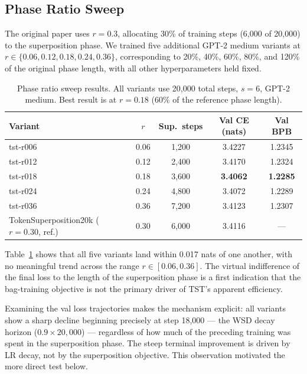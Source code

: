 \documentclass{article}
\begin{document}
\subsection{Phase Ratio Sweep}

The original paper uses $r=0.3$, allocating 30\% of training steps (6{,}000 of 20{,}000)
to the superposition phase.
We trained five additional GPT-2 medium variants at $r \in \{0.06, 0.12, 0.18, 0.24, 0.36\}$,
corresponding to 20\%, 40\%, 60\%, 80\%, and 120\% of the original phase length,
with all other hyperparameters held fixed.

\begin{table}[h]
\centering
\begin{tabular}{lcccc}
\toprule
\textbf{Variant} & \textbf{$r$} & \textbf{Sup.\ steps} & \textbf{Val CE (nats)} & \textbf{Val BPB} \\
\midrule
tst-r006 & 0.06 & 1{,}200 & 3.4227 & 1.2345 \\
tst-r012 & 0.12 & 2{,}400 & 3.4170 & 1.2324 \\
tst-r018 & 0.18 & 3{,}600 & \textbf{3.4062} & \textbf{1.2285} \\
tst-r024 & 0.24 & 4{,}800 & 3.4072 & 1.2289 \\
tst-r036 & 0.36 & 7{,}200 & 3.4123 & 1.2307 \\
\midrule
TokenSuperposition20k ($r=0.30$, ref.) & 0.30 & 6{,}000 & 3.4116 & --- \\
\bottomrule
\end{tabular}
\caption{Phase ratio sweep results. All variants use 20{,}000 total steps, $s=6$,
GPT-2 medium. Best result is at $r=0.18$ (60\% of the reference phase length).}
\label{tab:sweep}
\end{table}

Table~\ref{tab:sweep} shows that all five variants land within 0.017 nats of one another,
with no meaningful trend across the range $r \in [0.06, 0.36]$.
The virtual indifference of the final loss to the length of the superposition phase
is a first indication that the bag-training objective is not the primary driver of
TST's apparent efficiency.

Examining the val loss trajectories makes the mechanism explicit: all variants show a
sharp decline beginning precisely at step 18{,}000 — the WSD decay horizon
($0.9 \times 20{,}000$) — regardless of how much of the preceding training was spent
in the superposition phase.
The steep terminal improvement is driven by LR decay, not by the superposition
objective.
This observation motivated the more direct test below.
\end{document}
